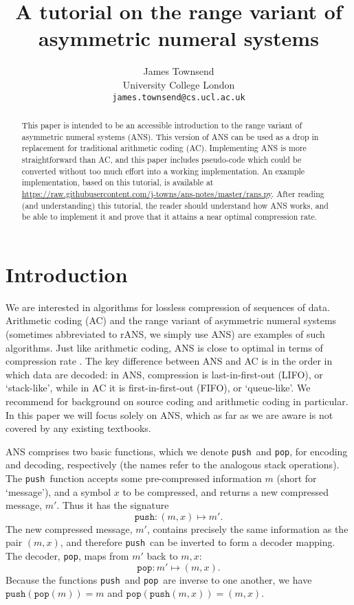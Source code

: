 \documentclass{article}
\author{
  James Townsend\\
  University College London\\
  \texttt{james.townsend@cs.ucl.ac.uk}
}
\title{A tutorial on the range variant of asymmetric numeral systems}
\theoremstyle{definition}
\newcommand{\push}{\texttt{push}}
\newcommand{\pop}{\texttt{pop}}
\begin{document}
\maketitle
\begin{abstract}
  This paper is intended to be an accessible introduction to the range variant
  of asymmetric numeral systems (ANS). This version of ANS can be used as a
  drop in replacement for traditional arithmetic coding (AC). Implementing ANS
  is more straightforward than AC, and this paper includes pseudo-code which
  could be converted without too much effort into a working implementation. An
  example implementation, based on this tutorial, is available at
  \url{https://raw.githubusercontent.com/j-towns/ans-notes/master/rans.py}.
  After reading (and understanding) this tutorial, the reader should understand
  how ANS works, and be able to implement it and prove that it attains a near
  optimal compression rate.
\end{abstract}


\section{Introduction}\label{sec:intro}
  We are interested in algorithms for lossless compression of sequences of
  data.  Arithmetic coding (AC) and the range variant of asymmetric numeral
  systems (sometimes abbreviated to rANS, we simply use ANS) are examples of
  such algorithms. Just like arithmetic coding, ANS is close to optimal in
  terms of compression rate \citep{witten1987, duda2009}. The key difference
  between ANS and AC is in the order in which data are decoded: in ANS,
  compression is last-in-first-out (LIFO), or `stack-like', while in AC it is
  first-in-first-out (FIFO), or `queue-like'. We recommend
  \cite[Chapter~4-6]{mackay2003} for background on source coding and arithmetic
  coding in particular. In this paper we will focus solely on ANS, which as far
  as we are aware is not covered by any existing textbooks.

  ANS comprises two basic functions, which we denote \push\ and \pop, for
  encoding and decoding, respectively (the names refer to the analogous stack
  operations). The \push\ function accepts some pre-compressed information
  \(m\) (short for `message'), and a symbol \(x\) to be compressed, and returns
  a new compressed message, \(m'\). Thus it has the signature
  \begin{equation}
    \push:(m, x) \mapsto m'.
  \end{equation}
  The new compressed message, \(m'\), contains precisely the same information
  as the pair \((m, x)\), and therefore \push\ can be inverted to form a
  decoder mapping.  The decoder, \pop, maps from \(m'\) back to \(m, x\):
  \begin{equation}
    \pop:m' \mapsto (m, x).
  \end{equation}
  Because the functions \push\ and \pop\ are inverse to one another, we have
  \(\push(\pop(m))=m\) and \(\pop(\push(m, x)) = (m, x)\).
\end{document}

